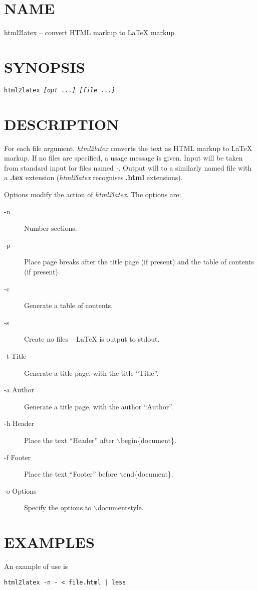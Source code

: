 
\section*{NAME}
html2latex -- convert HTML markup to LaTeX markup
\section*{SYNOPSIS}{\tt html2latex {\it [opt ...] [file ...]}}\section*{DESCRIPTION}
For each file argument, {\it html2latex} converts the text as
HTML markup to LaTeX markup.  If no files are specified, a usage
message is given.  Input will be taken from standard input for files
named {\it -}.  Output will to a similarly named file with a
{\bf .tex} extension ({\it html2latex} recognises
{\bf .html} extensions).
\par 
Options modify the action of {\it html2latex}.  The options are:
\begin{description}\item[-n]Number sections.
\item[-p]Place page breaks after the title page (if present) and the
table of contents (if present).
\item[-c]Generate a table of contents.
\item[-s]Create no files -- LaTeX is output to stdout.
\item[-t Title]Generate a title page, with the title ``Title''.
\item[-a Author]Generate a title page, with the author ``Author''.
\item[-h Header]Place the text ``Header'' after $\backslash$begin\{document\}.
\item[-f Footer]Place the text ``Footer'' before $\backslash$end\{document\}.
\item[-o Options]Specify the options to $\backslash$documentstyle.
\end{description}\section*{EXAMPLES}
An example of use is
\begin{verbatim}html2latex -n - < file.html | less
\end{verbatim}
